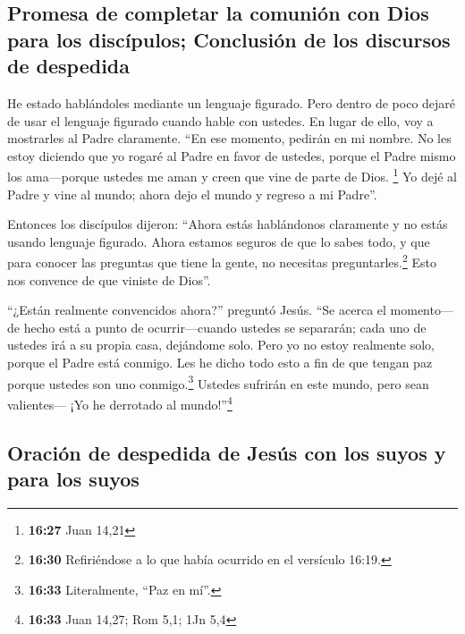 \hypertarget{promesa-de-completar-la-comuniuxf3n-con-dios-para-los-discuxedpulos-conclusiuxf3n-de-los-discursos-de-despedida}{%
\subsection{Promesa de completar la comunión con Dios para los
discípulos; Conclusión de los discursos de
despedida}\label{promesa-de-completar-la-comuniuxf3n-con-dios-para-los-discuxedpulos-conclusiuxf3n-de-los-discursos-de-despedida}}

 He estado hablándoles mediante un lenguaje figurado.
Pero dentro de poco dejaré de usar el lenguaje figurado cuando hable con
ustedes. En lugar de ello, voy a mostrarles al Padre claramente.
 ``En ese momento, pedirán en mi nombre. No les estoy
diciendo que yo rogaré al Padre en favor de ustedes, 
porque el Padre mismo los ama---porque ustedes me aman y creen que vine
de parte de Dios. \footnote{\textbf{16:27} Juan 14,21} 
Yo dejé al Padre y vine al mundo; ahora dejo el mundo y regreso a mi
Padre''.

 Entonces los discípulos dijeron: ``Ahora estás
hablándonos claramente y no estás usando lenguaje figurado.
 Ahora estamos seguros de que lo sabes todo, y que para
conocer las preguntas que tiene la gente, no necesitas
preguntarles.\footnote{\textbf{16:30} Refiriéndose a lo que había
  ocurrido en el versículo 16:19.} Esto nos convence de que viniste de
Dios''.

 ``¿Están realmente convencidos ahora?'' preguntó Jesús.
 ``Se acerca el momento---de hecho está a punto de
ocurrir---cuando ustedes se separarán; cada uno de ustedes irá a su
propia casa, dejándome solo. Pero yo no estoy realmente solo, porque el
Padre está conmigo.  Les he dicho todo esto a fin de que
tengan paz porque ustedes son uno conmigo.\footnote{\textbf{16:33}
  Literalmente, ``Paz en mí''.} Ustedes sufrirán en este mundo, pero
sean valientes--- ¡Yo he derrotado al mundo!''\footnote{\textbf{16:33}
  Juan 14,27; Rom 5,1; 1Jn 5,4}

\hypertarget{oraciuxf3n-de-despedida-de-jesuxfas-con-los-suyos-y-para-los-suyos}{%
\subsection{Oración de despedida de Jesús con los suyos y para los
suyos}\label{oraciuxf3n-de-despedida-de-jesuxfas-con-los-suyos-y-para-los-suyos}}

